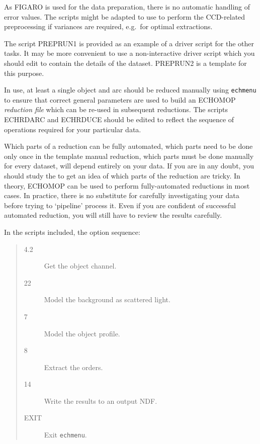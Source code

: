 \documentclass[twoside,11pt]{starlink}
\begin{document}
As FIGARO is used for the data preparation, there is no automatic handling of
error values.  The scripts might be adapted to use 
to perform the CCD-related preprocessing if variances are required, e.g.\ for
optimal extractions.

The script PREPRUN1 is provided as an example of a driver script for the
other tasks.
It may be more convenient to use a non-interactive driver script which you
should edit to contain the details of the dataset.
PREPRUN2 is a template for this purpose.

In use, at least a single object and arc should be reduced manually using
\texttt{echmenu} to ensure that correct general parameters are used to
build an ECHOMOP \emph{reduction file} which can be re-used in subsequent
reductions.  The scripts ECHRDARC and ECHRDUCE should be edited to
reflect the sequence of operations required for your particular data.

Which parts of a reduction can be fully automated, which parts need to be
done only once in the template manual reduction, which parts must be done
manually for every dataset, will depend entirely on your data.  If you are in
any doubt, you should study the  to get an idea of which parts of the reduction are tricky.
In theory, ECHOMOP can be used to perform fully-automated reductions in most
cases.  In practice, there is no substitute for carefully investigating your
data before trying to `pipeline' process it.  Even if you are confident of
successful automated reduction, you will still have to review the results
carefully.

In the scripts included, the  option
sequence:

\begin{quote}
\begin{description}

\item [4.2 ]
      Get the object channel.

\item [22 ]
      Model the background as scattered light.

\item [7 ]
      Model the object profile.

\item [8 ]
      Extract the orders.

\item [14 ]
      Write the results to an output NDF\@.

\item [EXIT]
      Exit \texttt{echmenu}.

\end{description}
\end{quote}
\end{document}
